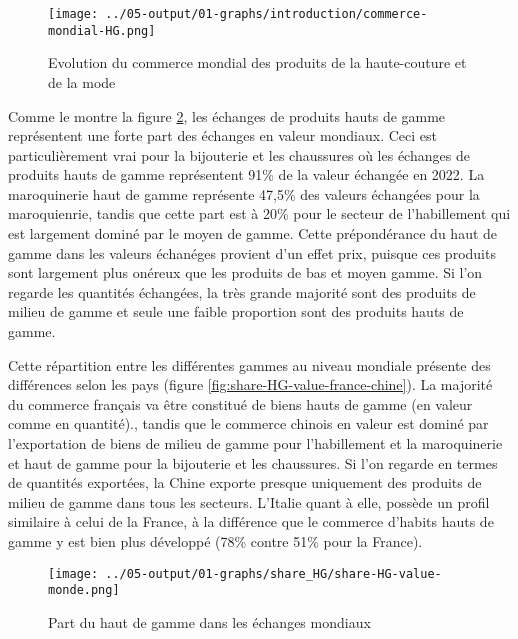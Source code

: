 \documentclass[french,10pt,a4paper]{article}
\begin{document}
\begin{figure}[!h]
  \centering
  \texttt{[image: ../05-output/01-graphs/introduction/commerce-mondial-HG.png]}
  \caption{Evolution du commerce mondial des produits de la haute-couture et de la mode}
  \label{fig:commerce-mondial-HG}
\end{figure}


Comme le montre la figure \ref{fig:share-HG-value-monde}, les échanges de produits hauts de gamme représentent une forte part des échanges en valeur mondiaux. Ceci est particulièrement vrai pour la bijouterie et les chaussures où les échanges de produits hauts de gamme représentent 91\% de la valeur échangée en 2022. La maroquinerie haut de gamme représente 47,5\% des valeurs échangées pour la maroquienrie, tandis que cette part est à 20\% pour le secteur de l'habillement qui est largement dominé par le moyen de gamme. Cette prépondérance du haut de gamme dans les valeurs échanéges provient d'un effet prix, puisque ces produits sont largement plus onéreux que les produits de bas et moyen gamme. Si l'on regarde les quantités échangées, la très grande majorité sont des produits de milieu de gamme et seule une faible proportion sont des produits hauts de gamme.

Cette répartition entre les différentes gammes au niveau mondiale présente des différences selon les pays (figure \ref{fig:share-HG-value-france-chine}). La majorité du commerce français va être constitué de biens hauts de gamme (en valeur comme en quantité)., tandis que le commerce chinois en valeur est dominé par l'exportation de biens de milieu de gamme pour l'habillement et la maroquinerie et haut de gamme pour la bijouterie et les chaussures. Si l'on regarde en termes de quantités exportées, la Chine exporte presque uniquement des produits de milieu de gamme dans tous les secteurs. L'Italie quant à elle, possède un profil similaire à celui de la France, à la différence que le commerce d'habits hauts de gamme y est bien plus développé (78\% contre 51\% pour la France).

\begin{figure}[!h]
  \centering
  \texttt{[image: ../05-output/01-graphs/share\_HG/share-HG-value-monde.png]}
  \caption{Part du haut de gamme dans les échanges mondiaux}
  \label{fig:share-HG-value-monde}
\end{figure}
\end{document}
